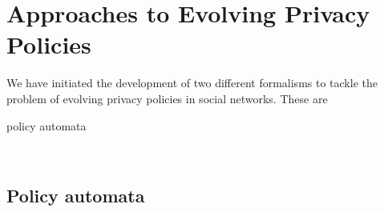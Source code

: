\section{Approaches to Evolving Privacy Policies}

We have initiated the development of two different formalisms to tackle the problem of evolving privacy policies in social networks. These are
\begin{inparaenum}[i)]
\item policy automata~\cite{PCPS16aaeppsn}
\item \tfppf~\cite{PKSS16sepposn}
\end{inparaenum}

\subsection{Policy automata}

\subsection{\tfppf}
